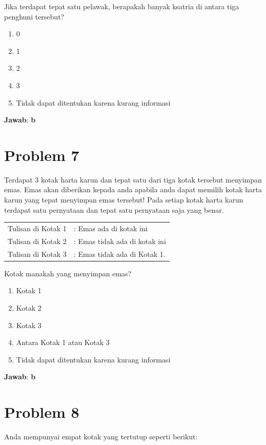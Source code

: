 \documentclass{article}
\theoremstyle{plain}
\begin{document}
\bigskip
\noindent Jika terdapat tepat satu pelawak, berapakah banyak ksatria di antara tiga penghuni tersebut?

	\begin{enumerate}[-,topsep=0pt, nosep,label=\alph*. ]
		\item 0
		\item 1
		\item 2
		\item 3
		\item Tidak dapat ditentukan karena kurang informasi
	\end{enumerate}

\bigskip
\noindent \textbf{Jawab}: \textbf{b}

\newpage
\section*{Problem 7}
Terdapat 3 kotak harta karun dan tepat satu dari tiga kotak tersebut menyimpan emas. Emas akan diberikan kepada anda apabila anda dapat memilih kotak harta karun yang tepat menyimpan emas tersebut! Pada setiap kotak harta karun terdapat satu pernyataan dan tepat satu pernyataan saja yang benar.

\bigskip
\noindent \begin{tabular}{ll}
	Tulisan di Kotak 1 &: Emas ada di kotak ini \\
	Tulisan di Kotak 2 &: Emas tidak ada di kotak ini \\
	Tulisan di Kotak 3 &: Emas tidak ada di Kotak 1.
\end{tabular} 

\bigskip
\noindent Kotak manakah yang menyimpan emas?

	\begin{enumerate}[-,topsep=0pt, nosep,label=\alph*. ]
		\item Kotak 1
		\item Kotak 2
		\item Kotak 3
		\item Antara Kotak 1 atau Kotak 3
		\item Tidak dapat ditentukan karena kurang informasi
	\end{enumerate}

\bigskip
\noindent \textbf{Jawab}: \textbf{b}

\newpage
\section*{Problem 8}
Anda mempunyai empat kotak yang tertutup seperti berikut:
\end{document}
